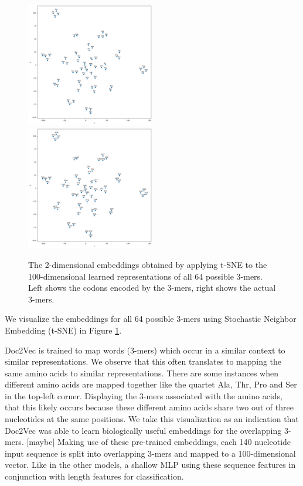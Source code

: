 \begin{figure}
	\includegraphics[width=0.5\textwidth]{../visualizations/ch4-methods/tSNE-d2v.png} 	\includegraphics[width=0.5\textwidth]{../visualizations/ch4-methods/tSNE-d2v_bases.png} 
	\caption{
		The 2-dimensional embeddings obtained by applying t-SNE to the 100-dimensional learned representations of all 64 possible 3-mers. Left shows the codons encoded by the 3-mers, right shows the actual 3-mers.
		 }
	\label{fig:tsne}
\end{figure}

We visualize the embeddings for all 64 possible 3-mers using Stochastic Neighbor Embedding (t-SNE) \cite{tsne} in Figure \ref{fig:tsne}.

Doc2Vec is trained to map words (3-mers) which occur in a similar context to similar representations. We observe that this often translates to mapping the same amino acids to similar representations. There are some instances when different amino acids are mapped together like the quartet Ala, Thr, Pro and Ser in the top-left corner. Displaying the 3-mers associated with the amino acids, that this likely occurs because these different amino acids share two out of three nucleotides at the same positions. We take this visualization as an indication that Doc2Vec was able to learn biologically useful embeddings for the overlapping 3-mers.
[maybe] Making use of these pre-trained embeddings, each 140 nucleotide input sequence is split into overlapping 3-mers and mapped to a 100-dimensional vector. Like in the other models, a shallow MLP using these sequence features in conjunction with length features for classification.
